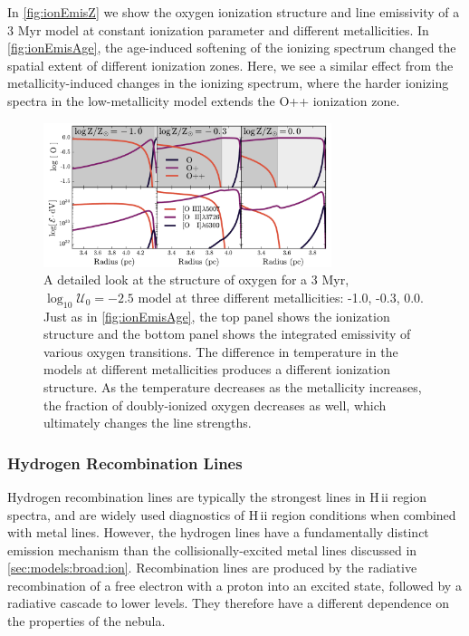 \documentclass[trackchanges, twocolumn, tighten]{aastex61}
\newcommand{\Fig}[1]{\autoref{fig:#1}}
\newcommand{\Sec}[1]{\autoref{sec:#1}}
\newcommand{\logten}{\ensuremath{\log_{10}}}
\newcommand{\hii}{H\,{\sc ii}\xspace}
\newcommand{\logU}{\ensuremath{\logten \mathcal{U}_0}}
\begin{document}
In \Fig{ionEmisZ} we show the oxygen ionization structure and line emissivity of a 3 Myr model at constant ionization parameter and different metallicities. In \Fig{ionEmisAge}, the age-induced softening of the ionizing spectrum changed the spatial extent of different ionization zones. Here, we see a similar effect from the metallicity-induced changes in the ionizing spectrum, where the harder ionizing spectra in the low-metallicity model extends the O++ ionization zone.

\begin{figure}
  \begin{centering}
    \includegraphics[width=0.75\textwidth]{f8.pdf}
    \caption{A detailed look at the structure of oxygen for a 3 Myr, $\logU = -2.5$ model at three different metallicities: -1.0, -0.3, 0.0. Just as in \Fig{ionEmisAge}, the top panel shows the ionization structure and the bottom panel shows the integrated emissivity of various oxygen transitions. The difference in temperature in the models at different metallicities produces a different ionization structure. As the temperature decreases as the metallicity increases, the fraction of doubly-ionized oxygen decreases as well, which ultimately changes the line strengths.}
    \label{fig:ionEmisZ}
  \end{centering}
\end{figure}

\subsubsection{Hydrogen Recombination Lines} \label{sec:models:broad:H}

Hydrogen recombination lines are typically the strongest lines in \hii region spectra, and are widely used diagnostics of \hii region conditions when combined with metal lines. However, the hydrogen lines have a fundamentally distinct emission mechanism than the collisionally-excited metal lines discussed in \Sec{models:broad:ion}. Recombination lines are produced by the radiative recombination of a free electron with a proton into an excited state, followed by a radiative cascade to lower levels. They therefore have a different dependence on the properties of the nebula.
\end{document}
